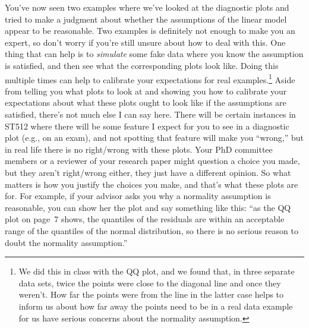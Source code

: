 \documentclass[a4paper, 12pt]{article}
\theoremstyle{plain}
\theoremstyle{definition}
\theoremstyle{remark}
\begin{document}
You've now seen two examples where we've looked at the diagnostic plots and tried to make a judgment about whether the assumptions of the linear model appear to be reasonable.  Two examples is definitely not enough to make you an expert, so don't worry if you're still unsure about how to deal with this.  One thing that can help is to {\em simulate} some fake data where you know the assumption is satisfied, and then see what the corresponding plots look like.  Doing this multiple times can help to calibrate your expectations for real examples.\footnote{We did this in class with the QQ plot, and we found that, in three separate data sets, twice the points were close to the diagonal line and once they weren't.  How far the points were from the line in the latter case helps to inform us about how far away the points need to be in a real data example for us have serious concerns about the normality assumption.}  Aside from telling you what plots to look at and showing you how to calibrate your expectations about what these plots ought to look like if the assumptions are satisfied, there's not much else I can say here.  There will be certain instances in ST512 where there will be some feature I expect for you to see in a diagnostic plot (e.g., on an exam), and not spotting that feature will make you ``wrong,'' but in real life there is no right/wrong with these plots.  Your PhD committee members or a reviewer of your research paper might question a choice you made, but they aren't right/wrong either, they just have a different opinion.  So what matters is how you justify the choices you make, and that's what these plots are for.  For example, if your advisor asks you why a normality assumption is reasonable, you can show her the plot and say something like this: ``as the QQ plot on page~7 shows, the quantiles of the residuals are within an acceptable range of the quantiles of the normal distribution, so there is no serious reason to doubt the normality assumption.''  
\end{document}
